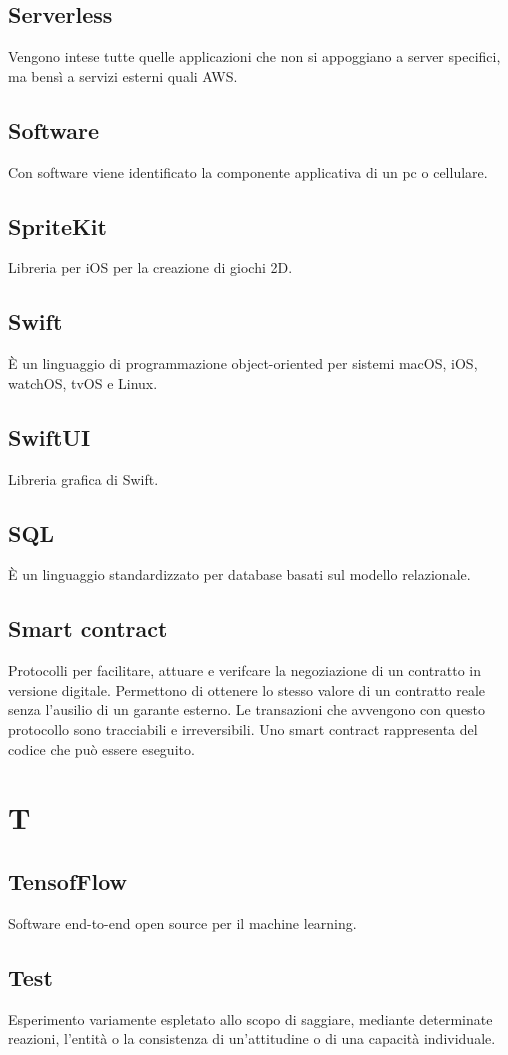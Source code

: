 \subsection{Serverless} Vengono intese tutte quelle applicazioni che non si appoggiano a server specifici, ma bensì a servizi esterni quali AWS.
\subsection{Software} Con software viene identificato la componente applicativa di un pc o cellulare.
\subsection{SpriteKit} Libreria per iOS per la creazione di giochi 2D.
\subsection{Swift} È un linguaggio di programmazione object-oriented per sistemi macOS, iOS, watchOS, tvOS e Linux.
\subsection{SwiftUI} Libreria grafica di Swift.
\subsection{SQL} È un linguaggio standardizzato per database basati sul modello relazionale.
\subsection{Smart contract} Protocolli per facilitare, attuare e verifcare la negoziazione di un contratto in versione digitale.
Permettono di ottenere lo stesso valore di un contratto reale senza l'ausilio di un garante esterno. Le transazioni che avvengono con questo protocollo sono tracciabili e irreversibili. Uno smart contract rappresenta del codice che può essere eseguito.
\newpage \section{T}
\subsection{TensofFlow} Software end-to-end open source per il machine learning.
\subsection{Test} Esperimento variamente espletato allo scopo di saggiare, mediante determinate reazioni, l'entità o la consistenza di un'attitudine o di una capacità individuale.
